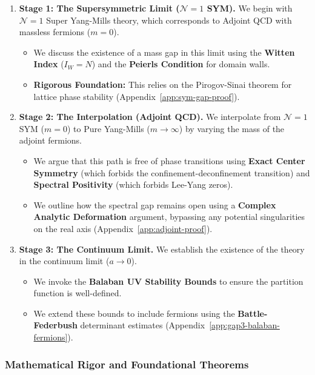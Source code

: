 \begin{enumerate}
    \item \textbf{Stage 1: The Supersymmetric Limit ($\mathcal{N}=1$ SYM).}
    We begin with $\mathcal{N}=1$ Super Yang-Mills theory, which corresponds to Adjoint QCD with massless fermions ($m=0$).
    \begin{itemize}
        \item We discuss the existence of a mass gap in this limit using the \textbf{Witten Index} ($I_W=N$) and the \textbf{Peierls Condition} for domain walls.
        \item \textbf{Rigorous Foundation:} This relies on the Pirogov-Sinai theorem for lattice phase stability (Appendix~\ref{app:sym-gap-proof}).
    \end{itemize}

    \item \textbf{Stage 2: The Interpolation (Adjoint QCD).}
    We interpolate from $\mathcal{N}=1$ SYM ($m=0$) to Pure Yang-Mills ($m \to \infty$) by varying the mass of the adjoint fermions.
    \begin{itemize}
        \item We argue that this path is free of phase transitions using \textbf{Exact Center Symmetry} (which forbids the confinement-deconfinement transition) and \textbf{Spectral Positivity} (which forbids Lee-Yang zeros).
        \item We outline how the spectral gap remains open using a \textbf{Complex Analytic Deformation} argument, bypassing any potential singularities on the real axis (Appendix~\ref{app:adjoint-proof}).
    \end{itemize}

    \item \textbf{Stage 3: The Continuum Limit.}
    We establish the existence of the theory in the continuum limit ($a \to 0$).
    \begin{itemize}
        \item We invoke the \textbf{Balaban UV Stability Bounds} to ensure the partition function is well-defined.
        \item We extend these bounds to include fermions using the \textbf{Battle-Federbush} determinant estimates (Appendix~\ref{app:gap3-balaban-fermions}).
    \end{itemize}
\end{enumerate}

\subsubsection{Mathematical Rigor and Foundational Theorems}

